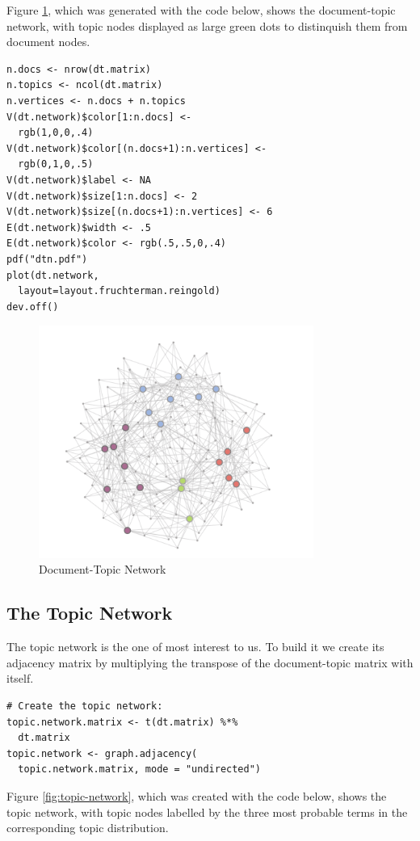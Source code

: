 \documentclass[%
	final,
	notitlepage,
	narroweqnarray,
	inline,
	]{ieee}
\begin{document}
Figure \ref{fig:dtn}, which was generated with the code below, 
shows the document-topic network, with 
topic nodes displayed as large green dots to distinquish them from
document nodes.


\begin{verbatim}
n.docs <- nrow(dt.matrix)
n.topics <- ncol(dt.matrix)
n.vertices <- n.docs + n.topics
V(dt.network)$color[1:n.docs] <- 
  rgb(1,0,0,.4)
V(dt.network)$color[(n.docs+1):n.vertices] <- 
  rgb(0,1,0,.5)
V(dt.network)$label <- NA
V(dt.network)$size[1:n.docs] <- 2
V(dt.network)$size[(n.docs+1):n.vertices] <- 6
E(dt.network)$width <- .5
E(dt.network)$color <- rgb(.5,.5,0,.4)
pdf("dtn.pdf")
plot(dt.network, 
  layout=layout.fruchterman.reingold)
dev.off()
\end{verbatim}


\begin{figure}
\centering
\includegraphics[width=90mm]{dtn.pdf}
\caption{Document-Topic Network}
\label{fig:dtn}
\end{figure}


\subsection{The Topic Network}

\PARstart The topic network is the one of most interest to us.  To build it
we create its adjacency matrix by multiplying the transpose of the document-topic
matrix with itself.

\begin{verbatim}
# Create the topic network:
topic.network.matrix <- t(dt.matrix) %*% 
  dt.matrix
topic.network <- graph.adjacency(
  topic.network.matrix, mode = "undirected")
\end{verbatim}

Figure \ref{fig:topic-network}, which was created with the code below, shows the 
topic network, with 
topic nodes labelled by the three most probable terms in the corresponding
topic distribution.
\end{document}
